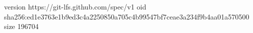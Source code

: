 version https://git-lfs.github.com/spec/v1
oid sha256:ed1e3763e1b9ed3c4a2250850a705c4b99547bf7ceae3a234f9b4aa01a570500
size 196704
